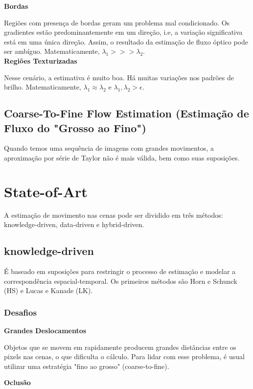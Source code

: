 \documentclass[12pt, a4paper]{article}
\begin{document}
\textbf{Bordas}

Regiões com presença de bordas geram um problema mal condicionado. Os gradientes estão predominantemente em um direção, i.e, a variação significativa está em uma única direção. Assim, o resultado da estimação de fluxo óptico pode ser ambíguo. Matematicamente, $\lambda_1 >>> \lambda_2$. \\

\textbf{Regiões Texturizadas}

Nesse cenário, a estimativa é muito boa. Há muitas variações nos padrões de brilho. Matematicamente, $\lambda_1 \approx \lambda_2$ e $\lambda_1, \lambda_2 > \epsilon$.

\subsection{Coarse-To-Fine Flow Estimation (Estimação de Fluxo do "Grosso ao Fino") }

Quando temos uma sequência de imagens com grandes movimentos, a aproximação por série de Taylor não é mais válida, bem como suas suposições.


\section{State-of-Art}

A estimação de movimento nas cenas pode ser dividido em três métodos: knowledge-driven, data-driven e hybrid-driven. 

\subsection{knowledge-driven}

É baseado em suposições para restringir o processo de estimação e modelar a correspondência espacial-temporal. Os primeiros métodos são Horn e Schunck (HS) e Lucas e Kanade (LK). 

\subsubsection{Desafios}

\textbf{Grandes Deslocamentos}

Objetos que se movem em rapidamente producem grandes distâncias entre os pixels nas cenas, o que dificulta o cálculo. Para lidar com esse problema, é usual utilizar uma estratégia "fino ao grosso" (coarse-to-fine).

\textbf{Oclusão}
\end{document}
